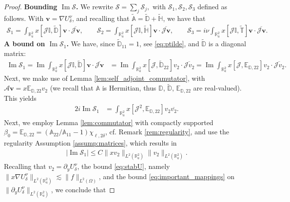 \documentclass[10pt,a4paper]{amsart}
\renewcommand{\Im}{\operatorname{Im}}
\renewcommand{\vec}[1]{\mathbf{#1}}
\begin{document}
\begin{proof}
\textbf{Bounding $\Im\mathcal{S}$. }		
We rewrite $
	\mathcal{S}=\sum_{j}\mathcal{S}_j, $
with $\mathcal{S}_1, \mathcal{S}_2, \mathcal{S}_3$ defined as follows. With $\vec{v}=\nabla U^{\nu}_{\delta}$, and recalling that  $\widetilde{\mathbb{A}}=\widetilde{\mathbb{D}}+\widetilde{\mathbb{H}}$, we have that  
\begin{align}
	\label{eq:s123}
	\mathcal{S}_1=\int_{\mathbb{R}^2_a}x[\mathcal{J}\mathbb{I}, \widetilde{\mathbb{D}}]\vec{v}\cdot \overline{\mathcal{J}\vec{v}},\qquad 
	\mathcal{S}_2=\int_{\mathbb{R}^2_a}x[\mathcal{J}\mathbb{I}, \widetilde{\mathbb{H}}]\vec{v}\cdot \overline{\mathcal{J}\vec{v}},\qquad 			\mathcal{S}_3=i\nu \int_{\mathbb{R}^2_a}x[\mathcal{J}\mathbb{I}, \widetilde{\mathbb{T}}]\vec{v}\cdot \overline{\mathcal{J}\vec{v}}.
\end{align} 
\textbf{A bound on $\Im \mathcal{S}_1$. }We have, since $\widetilde{\mathbb{D}}_{11}=1$, see  \eqref{eq:ptilde}, and $\widetilde{\mathbb{D}}$ is a diagonal matrix:
\begin{align}
	\label{eq:I1}
	\Im\mathcal{S}_1=\Im \int_{\mathbb{R}^2_a}x[\mathcal{J}\mathbb{I}, \widetilde{\mathbb{D}}]\vec{v}\cdot \overline{\mathcal{J}\vec{v}}&=	\Im \int_{\mathbb{R}^2_a}x[\mathcal{J},\widetilde{\mathbb{D}}_{22}]v_2\cdot \overline{\mathcal{J}v_2}=\Im \int_{\mathbb{R}^2_a}x[\mathcal{J},\mathbb{E}_{\mathbb{D},22}]v_2\cdot \overline{\mathcal{J}v_2}.
\end{align}
Next, we make use of Lemma \ref{lem:self_adjoint_commutator}, with $\mathcal{A}\vec{v}=x\mathbb{E}_{\mathbb{D},22}v_2$ (we recall that $\mathbb{A}$ is Hermitian, thus $\mathbb{D}$, $\widetilde{\mathbb{D}}$, ${\mathbb{E}}_{\mathbb{D},22}$ are real-valued). This yields
\begin{align*}
	2i\Im \mathcal{S}_1&=\int_{\mathbb{R}^2_a}x[\mathcal{J}^2, \mathbb{E}_{\mathbb{D},22}]v_2\overline{v_2}.
\end{align*}
Next, we employ Lemma \ref{lem:commutator} with compactly supported  $\beta_0=\mathbb{E}_{\mathbb{D},22}=(\mathbb{A}_{22}/\mathbb{A}_{11}-1)\chi_{\ell,2\delta}$, cf. Remark \ref{rem:regularity}, and use the regularity Assumption \ref{assump:matrices}, which results in 
\begin{align*}
	|\Im \mathcal{S}_1|\leq C \|xv_2\|_{L^2(\mathbb{R}^2_a)}\|v_2\|_{L^2(\mathbb{R}^2_a)}.
\end{align*}
Recalling that $v_2=\partial_y U^{\nu}_{\delta}$, the bound \eqref{eq:stabU}, namely $\|x\nabla U^{\nu}_{\delta}\|_{L^2(\mathbb{R}^2_a)}\lesssim \|f\|_{L^2(\Omega)}$, and the bound \eqref{eq:important_mappings} on $\|\partial_y U^{\nu}_{\delta}\|_{L^2(\mathbb{R}^2_a)}$, we conclude that 

\end{proof}
\end{document}
